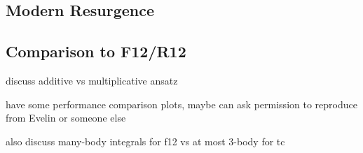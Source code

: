\subsection{Modern Resurgence}


\subsection{Comparison to F12/R12}

discuss additive vs multiplicative ansatz

have some performance comparison plots, maybe can ask permission to reproduce from Evelin or someone else

also discuss many-body integrals for f12 vs at most 3-body for tc


